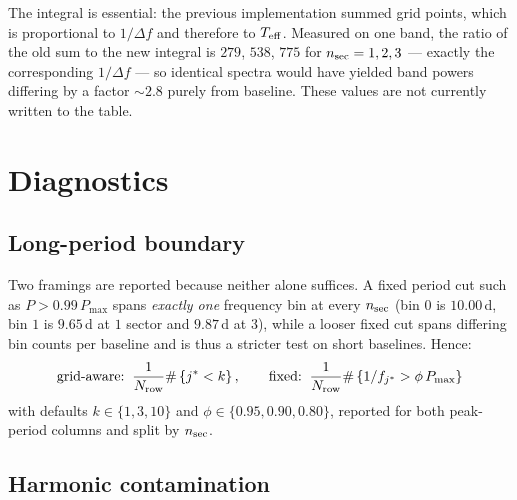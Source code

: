 \documentclass[11pt]{article}
\begin{document}
The integral is essential: the previous implementation summed grid points, which is
proportional to $1/\Delta f$ and therefore to $T_{\rm eff}$. Measured on one band, the
ratio of the old sum to the new integral is $279$, $538$, $775$ for $n_{\rm sec} = 1,2,3$
--- exactly the corresponding $1/\Delta f$ --- so identical spectra would have yielded
band powers differing by a factor $\sim2.8$ purely from baseline. These values are not
currently written to the table.

\section{Diagnostics}

\subsection{Long-period boundary}

Two framings are reported because neither alone suffices. A fixed period cut such as
$P > 0.99\,P_{\max}$ spans \emph{exactly one} frequency bin at every $n_{\rm sec}$
(bin $0$ is $10.00$\,d, bin $1$ is $9.65$\,d at $1$ sector and $9.87$\,d at $3$), while a
looser fixed cut spans differing bin counts per baseline and is thus a stricter test on
short baselines. Hence:
%
\begin{equation}
  \text{grid-aware:}\;\; \frac{1}{N_{\rm row}}\#\left\{ j^{\ast} < k \right\},
  \qquad
  \text{fixed:}\;\; \frac{1}{N_{\rm row}}\#\left\{ 1/f_{j^{\ast}} > \phi\,P_{\max}\right\}
  \label{eq:boundary}
\end{equation}
%
with defaults $k \in \{1,3,10\}$ and $\phi \in \{0.95, 0.90, 0.80\}$, reported for both
peak-period columns and split by $n_{\rm sec}$.

\subsection{Harmonic contamination}
\end{document}
